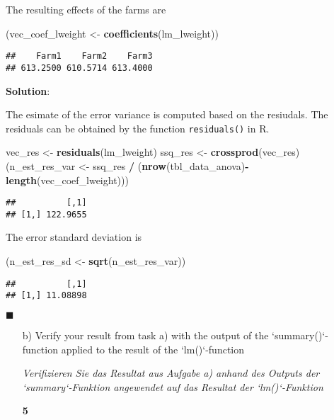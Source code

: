 \documentclass[
]{article}
\newenvironment{Shaded}{\begin{snugshade}}{\end{snugshade}}
\newcommand{\KeywordTok}[1]{\textcolor[rgb]{0.13,0.29,0.53}{\textbf{#1}}}
\newcommand{\NormalTok}[1]{#1}
\newcommand{\OperatorTok}[1]{\textcolor[rgb]{0.81,0.36,0.00}{\textbf{#1}}}
\newcommand{\StringTok}[1]{\textcolor[rgb]{0.31,0.60,0.02}{#1}}
\newcommand{\points}[1]
{\begin{flushright}\textbf{#1}\end{flushright}}
\newcommand{\solstart}
{\vspace{3ex}\textbf{Solution}:}
\newcommand{\solend}
{\vspace{2ex}$\blacksquare$}
\begin{document}
The resulting effects of the farms are

\begin{Shaded}
\begin{Highlighting}[]
\NormalTok{(vec_coef_lweight <-}\StringTok{ }\KeywordTok{coefficients}\NormalTok{(lm_lweight))}
\end{Highlighting}
\end{Shaded}

\begin{verbatim}
##    Farm1    Farm2    Farm3 
## 613.2500 610.5714 613.4000
\end{verbatim}

\solstart

The esimate of the error variance is computed based on the resiudals.
The residuals can be obtained by the function \texttt{residuals()} in R.

\begin{Shaded}
\begin{Highlighting}[]
\NormalTok{vec_res <-}\StringTok{ }\KeywordTok{residuals}\NormalTok{(lm_lweight)}
\NormalTok{ssq_res <-}\StringTok{ }\KeywordTok{crossprod}\NormalTok{(vec_res)}
\NormalTok{(n_est_res_var <-}\StringTok{ }\NormalTok{ssq_res }\OperatorTok{/}\StringTok{ }\NormalTok{(}\KeywordTok{nrow}\NormalTok{(tbl_data_anova)}\OperatorTok{-}\KeywordTok{length}\NormalTok{(vec_coef_lweight)))}
\end{Highlighting}
\end{Shaded}

\begin{verbatim}
##          [,1]
## [1,] 122.9655
\end{verbatim}

The error standard deviation is

\begin{Shaded}
\begin{Highlighting}[]
\NormalTok{(n_est_res_sd <-}\StringTok{ }\KeywordTok{sqrt}\NormalTok{(n_est_res_var))}
\end{Highlighting}
\end{Shaded}

\begin{verbatim}
##          [,1]
## [1,] 11.08898
\end{verbatim}

\solend

\clearpage
\pagebreak

\begin{enumerate}
\item[b)] Verify your result from task a) with the output of the `summary()`-function applied to the result of the `lm()`-function

\textit{Verifizieren Sie das Resultat aus Aufgabe a) anhand des Outputs der `summary`-Funktion angewendet auf das Resultat der `lm()`-Funktion}
\points{5}
\end{enumerate}
\end{document}
